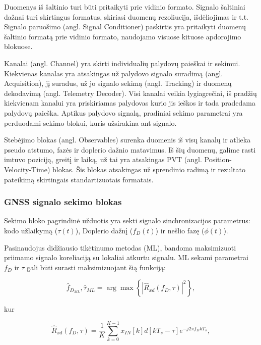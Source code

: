 \documentclass[main.tex]{subfiles}
\begin{document}
Duomenys iš šaltinio turi būti pritaikyti prie vidinio formato. Signalo šaltiniai
dažnai turi skirtingus formatus, skiriasi duomenų rezoliucija, išdėliojimas ir t.t.
Signalo paruošimo (angl. Signal Conditioner) paskirtis yra pritaikyti duomenų šaltinio
formatą prie vidinio formato, naudojamo visuose kituose apdorojimo blokuose.

Kanalai (angl. Channel) yra skirti individualių palydovų paieškai ir sekimui.
Kiekvienas kanalas yra atsakingas už palydovo signalo suradimą (angl. Acquisition),
jį suradus, už jo signalo sekimą (angl. Tracking) ir duomenų dekodavimą (angl. Telemetry
Decoder). Visi kanalai veikia lygiagrečiai, iš pradžių kiekvienam kanalui yra
priskiriamas palydovas kurio jis ieškos ir tada pradedama palydovų paieška.
Aptikus palydovo signalą, pradiniai sekimo parametrai yra perduodami sekimo
blokui, kuris užsirakina ant signalo.

Stebėjimo blokas (angl. Observables) surenka duomenis iš visų kanalų ir atlieka
pseudo atstumo, fazės ir doplerio dažnio matavimus. Iš šių duomenų, galime
rasti imtuvo poziciją, greitį ir laiką, už tai yra atsakingas PVT
(angl. Position-Velocity-Time) blokas. Šis blokas atsakingas už sprendinio
radimą ir rezultato pateikimą skirtingais standartizuotais formatais.

\subsubsection{GNSS signalo sekimo blokas}\label{sec:tracking_block}

Sekimo bloko pagrindinė užduotis yra sekti signalo sinchronizacijos parametrus:
kodo užlaikymą ($\tau(t)$), Doplerio dažnį ($f_D(t)$) ir nešlio fazę ($\phi(t)$).

Pasinaudojus didžiausio tikėtinumo metodas (ML), bandoma maksimizuoti priimamo
signalo koreliaciją su lokaliai atkurtu signalu. ML sekami parametrai $f_D$ ir
$\tau$ gali būti surasti maksimizuojant šią funkciją:

\begin{equation}
    \hat{f}_{D_{ML}},\hat{\tau}_{ML} = \arg \max \left\{ \left| \hat{R}_{xd}(f_D, \tau) \right|^2 \right\},
\end{equation}

\noindent kur

\begin{equation}
    \hat{R}_{xd}(f_D, \tau) = \frac{1}{K} \sum^{K-1}_{k=0} {x_{IN}[k]d[kT_s-\tau]e^{-j2\pi f_D kT_s}},
\end{equation}
\end{document}
